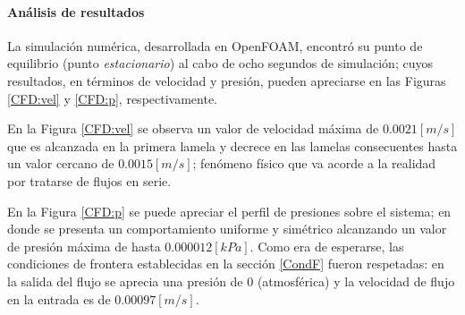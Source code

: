 \paragraph{An\'alisis de resultados}

\noindent
\justify

La simulaci\'on num\'erica, desarrollada en OpenFOAM, encontr\'o su punto de equilibrio (punto \textit{estacionario}) al cabo de ocho segundos de simulaci\'on; cuyos resultados, en t\'erminos de velocidad y presi\'on, pueden apreciarse en las Figuras \ref{CFD:vel} y \ref{CFD:p}, respectivamente.

\noindent
\justify

En la Figura \ref{CFD:vel} se observa un valor de velocidad m\'axima de $0.0021 [m/s]$ que es alcanzada en la primera lamela y decrece en las lamelas consecuentes hasta un valor cercano de $0.0015 [m/s]$; fen\'omeno f\'isico que va acorde a la realidad por tratarse de flujos en serie.

\noindent
\justify

En la Figura \ref{CFD:p} se puede apreciar el perfil de presiones sobre el sistema; en donde se presenta un comportamiento uniforme y sim\'etrico alcanzando un valor de presi\'on m\'axima de hasta $0.000012 [kPa]$. Como era de esperarse, las condiciones de frontera establecidas en la secci\'on \ref{CondF} fueron respetadas: en la salida del flujo se aprecia una presi\'on de $0$ (atmosf\'erica) y la velocidad de flujo en la entrada es de $0.00097 [m/s]$.





